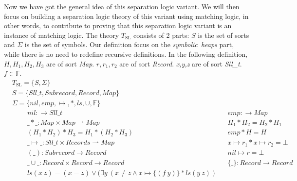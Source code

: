 \documentclass{article}
\theoremstyle{plain}
\begin{document}
Now we have got the general idea of this separation logic variant. We will then focus on building a separation logic theory of this variant using matching logic, in other words, to contribute to proving that this separation logic variant is an instance of matching logic. The theory $T_{\mathrm{SL}}$ consists of 2 parts: $S$ is the set of sorts and $\Sigma$ is the set of symbols. Our definition focus on the \textit{symbolic\ heaps} part, while there is no need to redefine recursive definitions. In the following definition, $\mathit{H,H_1,H_2,H_3}$ are of sort \textit{Map}. $\mathit{r,r_1,r_2}$ are of sort \textit{Record}. \textit{x,y,z} are of sort \textit{Sll\_t}. $f\in\mathbb{F}$.
\begin{align*}
&T_{\mathrm{SL}} =  \{ S , \Sigma \}\\
& S =  \{\mathit{Sll\_t} , \mathit{Subrecord} ,  \mathit{Record} , \mathit{Map} \} \\
&\Sigma = \{\mathit{nil} , \mathit{emp} , \mapsto ,  \mathit{*} , \mathit{ls} , \cup , \mathbb{F }\}\\
&\qquad\ nil:\to\mathit{Sll\_t} & &\mathit{emp}:\to \mathit{Map} \\ 
&\qquad\ \_*\_:\mathit{Map}\times\mathit{Map}\rightharpoonup Map& &\mathit{H_1 * H_2 = H_2 * H_1}\\
&\qquad\ (H_1 * H_2) * H_3 = H_1 * (H_2 * H_3)& & \mathit{emp}*\mathit{H}=\mathit{H}\\
&\qquad\ \_ \mapsto \_ :Sll\_t\times Records \rightharpoonup Map& & x \mapsto r_1 * x \mapsto r_2 = \bot\\
&\qquad\ \mathit{(\_)}:\mathit{Subrecord}\to\mathit{Record}& &nil \mapsto r = \bot
\\
&\qquad\ \_\cup\_:\mathit{Record}\times\mathit{Record}\to\mathit{Record} & &\{\_\}:\mathit{Record}\to\mathit{Record} \\&\qquad\ \mathit{ls} (x\ z) = (x = z)\vee ( \exists y\ (x \ne z \wedge x \mapsto \{( f\ y)\} *\mathit{ls} (y\ z))
\end{align*}
\end{document}
